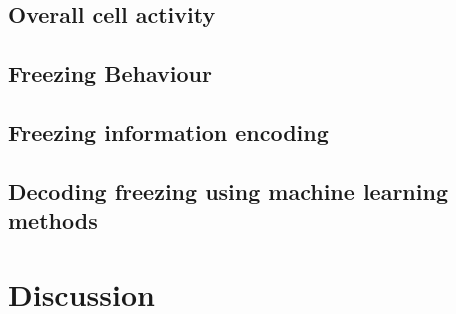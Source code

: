 \subsection{Overall cell activity}
\subsection{Freezing Behaviour}
\subsection{Freezing information encoding}
\subsection{Decoding freezing using machine learning methods}
\section{Discussion}

